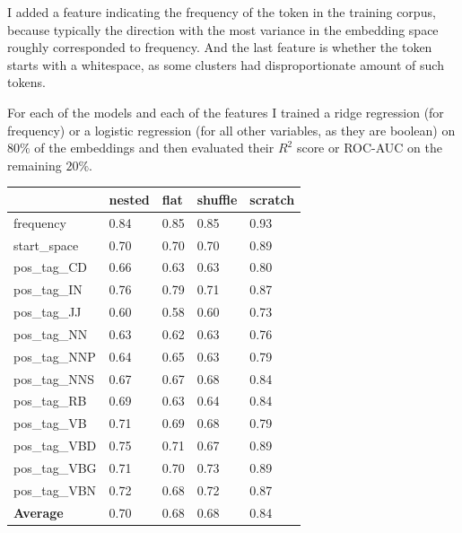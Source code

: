 \documentclass[a4paper, 11pt, oneside]{article}
\begin{document}
	I added a feature indicating the frequency of the token in the training corpus,
	because typically the direction with the most variance in the embedding space roughly
	corresponded to frequency. And the last feature is whether the token starts
	with a whitespace, as some clusters had disproportionate amount of such tokens.

	For each of the models and each of the features I trained a ridge regression (for
	frequency) or a logistic regression (for all other variables, as they are boolean)
	on $80\%$ of the embeddings and then evaluated their $R^{2}$ score or ROC-AUC
	on the remaining $20\%$.

	\begin{table}[ht]
		\centering
		\begin{tabular}{ |p{60pt} |p{40pt} |p{40pt} |p{40pt} |p{40pt}| }
			\hline
			                 & \textbf{nested} & \textbf{flat} & \textbf{shuffle} & \textbf{scratch} \\
			\hline
			frequency        & 0.84            & 0.85          & 0.85             & 0.93             \\
			\hline
			start\_space     & 0.70            & 0.70          & 0.70             & 0.89             \\
			\hline
			pos\_tag\_CD     & 0.66            & 0.63          & 0.63             & 0.80             \\
			\hline
			pos\_tag\_IN     & 0.76            & 0.79          & 0.71             & 0.87             \\
			\hline
			pos\_tag\_JJ     & 0.60            & 0.58          & 0.60             & 0.73             \\
			\hline
			pos\_tag\_NN     & 0.63            & 0.62          & 0.63             & 0.76             \\
			\hline
			pos\_tag\_NNP    & 0.64            & 0.65          & 0.63             & 0.79             \\
			\hline
			pos\_tag\_NNS    & 0.67            & 0.67          & 0.68             & 0.84             \\
			\hline
			pos\_tag\_RB     & 0.69            & 0.63          & 0.64             & 0.84             \\
			\hline
			pos\_tag\_VB     & 0.71            & 0.69          & 0.68             & 0.79             \\
			\hline
			pos\_tag\_VBD    & 0.75            & 0.71          & 0.67             & 0.89             \\
			\hline
			pos\_tag\_VBG    & 0.71            & 0.70          & 0.73             & 0.89             \\
			\hline
			pos\_tag\_VBN    & 0.72            & 0.68          & 0.72             & 0.87             \\
			\hline
			\textbf{Average} & 0.70            & 0.68          & 0.68             & 0.84             \\
			\hline
		\end{tabular}
	\end{table}
\end{document}
